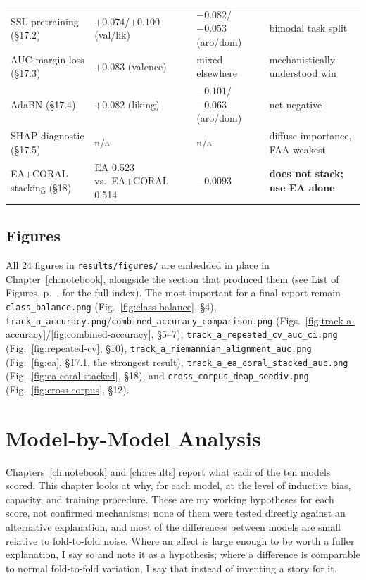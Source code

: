 \documentclass[11pt]{report}
\begin{document}
\begin{longtable}{p{5.5cm}p{2.3cm}p{2.1cm}p{4.3cm}}
SSL pretraining (\S17.2) & $+0.074$/$+0.100$ (val/lik) & $-0.082$/$-0.053$ (aro/dom) & bimodal task split \\
AUC-margin loss (\S17.3) & $+0.083$ (valence) & mixed elsewhere & mechanistically understood win \\
AdaBN (\S17.4) & $+0.082$ (liking) & $-0.101$/$-0.063$ (aro/dom) & net negative \\
SHAP diagnostic (\S17.5) & n/a & n/a & diffuse importance, FAA weakest \\
EA+CORAL stacking (\S18) & EA 0.523 vs.\ EA+CORAL 0.514 & $-0.0093$ & \textbf{does not stack; use EA alone} \\
\bottomrule
\end{longtable}

\section{Figures}
All 24 figures in \texttt{results/figures/} are embedded in place in
Chapter~\ref{ch:notebook}, alongside the section that produced them (see
List of Figures, p.~\pageref{fig:class-balance}, for the full index). The
most important for a final report remain \texttt{class\_balance.png}
(Fig.~\ref{fig:class-balance}, \S4),
\texttt{track\_a\_accuracy.png}/\texttt{combined\_accuracy\_comparison.png}
(Figs.~\ref{fig:track-a-accuracy}/\ref{fig:combined-accuracy}, \S5--7),
\texttt{track\_a\_repeated\_cv\_auc\_ci.png} (Fig.~\ref{fig:repeated-cv},
\S10), \texttt{track\_a\_riemannian\_alignment\_auc.png}
(Fig.~\ref{fig:ea}, \S17.1, the strongest result),
\texttt{track\_a\_ea\_coral\_stacked\_auc.png}
(Fig.~\ref{fig:ea-coral-stacked}, \S18), and
\texttt{cross\_corpus\_deap\_seediv.png} (Fig.~\ref{fig:cross-corpus},
\S12).

\chapter{Model-by-Model Analysis}
\label{ch:model-analysis}

Chapters~\ref{ch:notebook} and \ref{ch:results} report what each of the ten
models scored. This chapter looks at why, for each model, at the level of
inductive bias, capacity, and training procedure. These are my working
hypotheses for each score, not confirmed mechanisms: none of them were
tested directly against an alternative explanation, and most of the
differences between models are small relative to fold-to-fold noise. Where
an effect is large enough to be worth a fuller explanation, I say so and
note it as a hypothesis; where a difference is comparable to normal
fold-to-fold variation, I say that instead of inventing a story for it.
\end{document}
